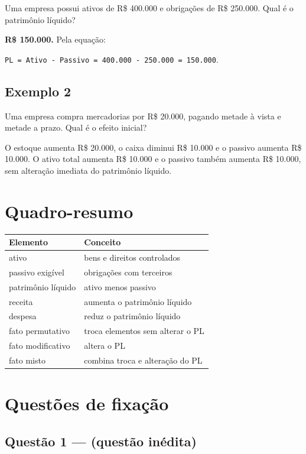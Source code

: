 \documentclass[11pt,a4paper]{article}
\begin{document}
Uma empresa possui ativos de R\$ 400.000 e obrigações de R\$ 250.000. Qual é o patrimônio líquido?

\textbf{R\$ 150.000.} Pela equação:

\texttt{PL = Ativo - Passivo = 400.000 - 250.000 = 150.000}.

\subsection*{Exemplo 2}

Uma empresa compra mercadorias por R\$ 20.000, pagando metade à vista e metade a prazo. Qual é o efeito inicial?

O estoque aumenta R\$ 20.000, o caixa diminui R\$ 10.000 e o passivo aumenta R\$ 10.000. O ativo total aumenta R\$ 10.000 e o passivo também aumenta R\$ 10.000, sem alteração imediata do patrimônio líquido.

\section*{Quadro-resumo}

\begin{tabularx}{\linewidth}{lX}
\toprule
 \textbf{Elemento} & \textbf{Conceito} \\
\midrule
 ativo & bens e direitos controlados \\
 passivo exigível & obrigações com terceiros \\
 patrimônio líquido & ativo menos passivo \\
 receita & aumenta o patrimônio líquido \\
 despesa & reduz o patrimônio líquido \\
 fato permutativo & troca elementos sem alterar o PL \\
 fato modificativo & altera o PL \\
 fato misto & combina troca e alteração do PL \\
\bottomrule
\end{tabularx}


\section*{Questões de fixação}

\subsection*{Questão 1 — (questão inédita)}
\end{document}
